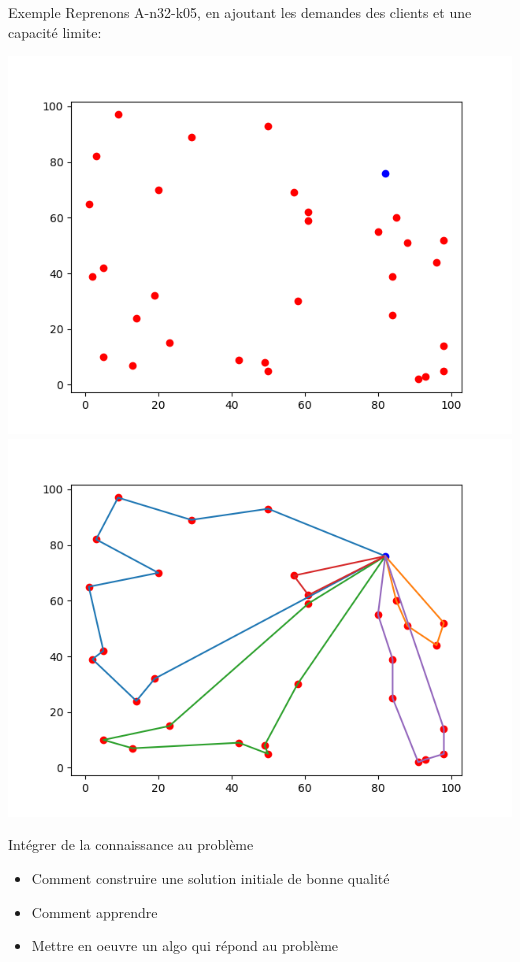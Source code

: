 \documentclass{beamer}
\begin{document}
\begin{frame}{Exemple}
Reprenons A-n32-k05, en ajoutant les demandes des clients et une capacité limite:
\begin{center}
\includegraphics[scale=0.32]{Instance.png}
\includegraphics[scale=0.32]{solutionCapacity.png}
\end{center}
\end{frame}

\begin{frame}
Intégrer de la connaissance au problème
\begin{itemize}
\item Comment construire une solution initiale de bonne qualité
\item Comment apprendre
\item Mettre en oeuvre un algo qui répond au problème
\end{itemize}
\end{frame}
\end{document}
